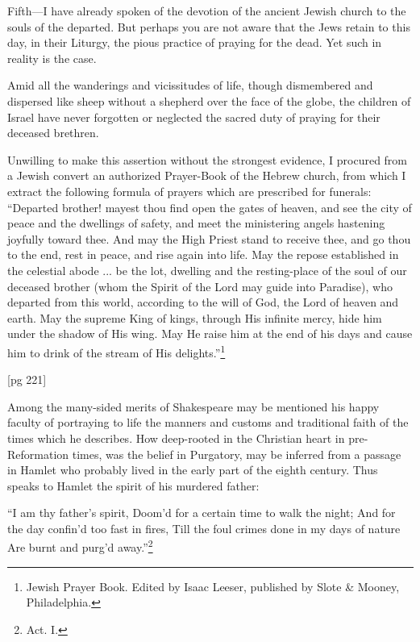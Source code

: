 Fifth—I have already spoken of the devotion
of the ancient Jewish church to the souls of the
departed. But perhaps you are not aware that
the Jews retain to this day, in their Liturgy, the
pious practice of praying for the dead. Yet such
in reality is the case.

Amid all the wanderings and vicissitudes of
life, though dismembered and dispersed like sheep
without a shepherd over the face of the globe, the
children of Israel have never forgotten or neglected
the sacred duty of praying for their deceased
brethren.

Unwilling to make this assertion without the
strongest evidence, I procured from a Jewish convert
an authorized Prayer-Book of the Hebrew
church, from which I extract the following
formula of prayers which are prescribed for
funerals: “Departed brother! mayest thou find
open the gates of heaven, and see the city of
peace and the dwellings of safety, and meet the
ministering angels hastening joyfully toward thee.
And may the High Priest stand to receive thee,
and go thou to the end, rest in peace, and rise
again into life. May the repose established in
the celestial abode ... be the lot, dwelling and
the resting-place of the soul of our deceased
brother (whom the Spirit of the Lord may guide
into Paradise), who departed from this world, according
to the will of God, the Lord of heaven and
earth. May the supreme King of kings, through
His infinite mercy, hide him under the shadow of
His wing. May He raise him at the end of his
days and cause him to drink of the stream of
His delights.”\footnote{Jewish Prayer Book.
Edited by Isaac Leeser, published by
Slote \& Mooney, Philadelphia.}

[pg 221]

Among the many-sided merits of Shakespeare
may be mentioned his happy faculty of portraying
to life the manners and customs and traditional
faith of the times which he describes. How deep-rooted
in the Christian heart in pre-Reformation
times, was the belief in Purgatory, may be inferred
from a passage in Hamlet who probably lived in
the early part of the eighth century. Thus speaks
to Hamlet the spirit of his murdered father:

“I am thy father's spirit,
Doom'd for a certain time to walk the night;
And for the day confin'd too fast in fires,
Till the foul crimes done in my days of nature
Are burnt and purg'd away.”\footnote{Act. I.}

